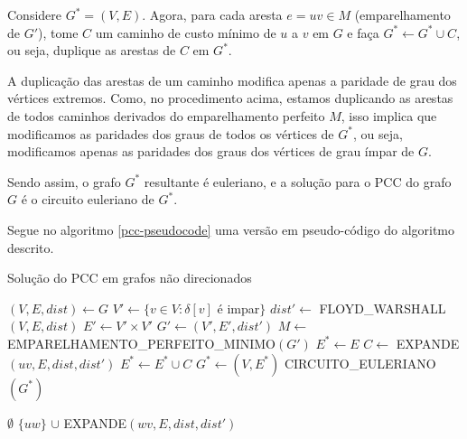 Considere $G^* = (V, E)$. Agora, para cada aresta $e = uv \in M$ (emparelhamento de $G'$), tome $C$ um caminho de custo mínimo de $u$ a $v$ em $G$ e faça $G^* \leftarrow G^* \cup C$, ou seja, duplique as arestas de $C$ em $G^*$.

A duplicação das arestas de um caminho modifica apenas a paridade de grau dos vértices extremos.
Como, no procedimento acima, estamos duplicando as arestas de todos caminhos derivados do emparelhamento perfeito $M$, isso implica que modificamos as paridades dos graus de todos os vértices de $G^*$, ou seja, modificamos apenas as paridades dos graus dos vértices de grau ímpar de $G$.

Sendo assim, o grafo $G^*$ resultante é euleriano, e a solução para o PCC do grafo $G$ é o circuito euleriano de $G^*$.


Segue no algoritmo \ref{pcc-pseudocode} uma versão em pseudo-código do algoritmo descrito.




    \begin{algorithm}
        \caption{Solução do PCC em grafos não direcionados}
        \label{pcc-pseudocode}
        \begin{algorithmic}[1]
        \State $(V, E, dist) \gets G$
        \State $V' \gets \{v \in V : \delta[v] $ é impar$\}$
        \State $dist' \gets $ FLOYD\_WARSHALL$(V, E, dist)$
        \State $E' \gets V' \times V'$
        \State $G' \gets (V', E', dist')$
        \State $M \gets $ EMPARELHAMENTO\_PERFEITO\_MINIMO$(G')$
        \State $E^* \gets E$
            \State $C \gets$ EXPANDE$(uv, E, dist, dist')$
            \State $E^* \gets E^* \cup C$
        \EndFor
        \State $G^* \gets (V, E^*)$
        \State \Return CIRCUITO\_EULERIANO$(G^*)$
        \EndFunction 

        \Return $\emptyset$
        \EndIf
            \State \Return $\{uw\}$  $\cup$ EXPANDE$(wv, E, dist, dist')$
            \EndIf
        \EndFor
        \EndFunction

        \end{algorithmic}
    \end{algorithm}

